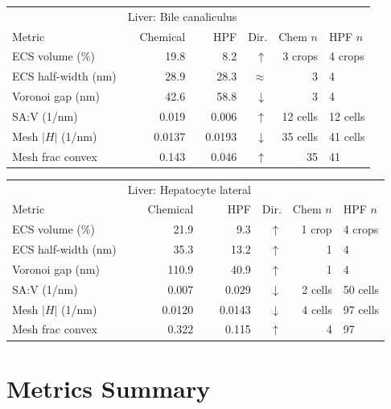 \documentclass[times, twoside]{zHenriquesLab-StyleBioRxiv}
\begin{document}
\begin{table}[t]
\vspace{1em}

\begin{tabular}{lrrrrl}
\toprule
& \multicolumn{2}{c}{Liver: Bile canaliculus} & & & \\
Metric & Chemical & HPF & Dir. & Chem $n$ & HPF $n$ \\
\midrule
ECS volume (\%) & 19.8 & 8.2 & $\uparrow$ & 3 crops & 4 crops \\
ECS half-width (nm) & 28.9 & 28.3 & $\approx$ & 3 & 4 \\
Voronoi gap (nm) & 42.6 & 58.8 & $\downarrow$ & 3 & 4 \\
SA:V (1/nm) & 0.019 & 0.006 & $\uparrow$ & 12 cells & 12 cells \\
Mesh $|H|$ (1/nm) & 0.0137 & 0.0193 & $\downarrow$ & 35 cells & 41 cells \\
Mesh frac convex & 0.143 & 0.046 & $\uparrow$ & 35 & 41 \\
\bottomrule
\end{tabular}

\vspace{1em}

\begin{tabular}{lrrrrl}
\toprule
& \multicolumn{2}{c}{Liver: Hepatocyte lateral} & & & \\
Metric & Chemical & HPF & Dir. & Chem $n$ & HPF $n$ \\
\midrule
ECS volume (\%) & 21.9 & 9.3 & $\uparrow$ & 1 crop & 4 crops \\
ECS half-width (nm) & 35.3 & 13.2 & $\uparrow$ & 1 & 4 \\
Voronoi gap (nm) & 110.9 & 40.9 & $\uparrow$ & 1 & 4 \\
SA:V (1/nm) & 0.007 & 0.029 & $\downarrow$ & 2 cells & 50 cells \\
Mesh $|H|$ (1/nm) & 0.0120 & 0.0143 & $\downarrow$ & 4 cells & 97 cells \\
Mesh frac convex & 0.322 & 0.115 & $\uparrow$ & 4 & 97 \\
\bottomrule
\end{tabular}
\end{table}

\section*{Metrics Summary}
\end{document}
